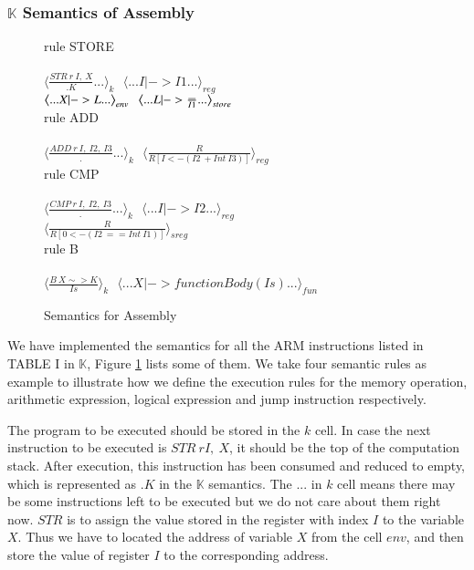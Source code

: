 \documentclass[letterpaper, 10 pt, conference]{IEEEtran}
\begin{document}
\subsubsection{$\mathbb{K}$ Semantics of Assembly}
\begin{figure}
rule STORE \\ \\
$\big\langle\frac{STR~r~I,~X}{.K}...\big\rangle_k~~~\big\langle... I |-> I1 ... \big\rangle_{reg}$\\
$\big\langle... X |-> L ...\big\rangle_{env}~~~\big\langle ... L |->\frac{\underline{\hbox to 2mm{}}}{I1}...\big\rangle_{store}$\\

rule ADD \\ \\
$\big\langle\frac{ADD ~r~I,~I2,~I3}{.}...\big\rangle_k~~~\big\langle\frac{R}{R[I<-(I2~+Int~I3)]}\big\rangle_{reg}$\\

rule CMP \\ \\
$\big\langle\frac{CMP~r~I,~I2,~I3}{.}...\big\rangle_k~~~\big\langle ... I|->I2 ...\big\rangle_{reg}$\\
$\big\langle\frac{R}{R[0<-(I2~==Int~I1)]}\big\rangle_{sreg}$\\

rule B \\ \\
$\big\langle\frac{B~X\sim >K}{Is}\big\rangle_k~~~\big\langle ... X|->functionBody(Is)...\big\rangle_{fun}$

\caption{Semantics for Assembly}
\label{assem}
\end{figure}
\par We have implemented the semantics for all the ARM instructions listed in TABLE I in $\mathbb{K}$, Figure \ref{assem} lists some of them. We take four semantic rules as example to illustrate how we define the execution rules for the memory operation, arithmetic expression, logical expression and jump instruction respectively.
\par The program to be executed should be stored in the $k$ cell. In case the next instruction to be executed is $STR~rI,~X$, it should be the top of the computation stack. After execution, this instruction has been consumed and reduced to empty, which is represented as $.K$ in the $\mathbb{K}$ semantics. The $...$ in $k$ cell means there may be some instructions left to be executed but we do not care about them right now. $STR$ is to assign the value stored in the register with index $I$ to the variable $X$. Thus we have to located the address of variable $X$ from the cell $env$, and then store the value of register $I$ to the corresponding address.
\end{document}
